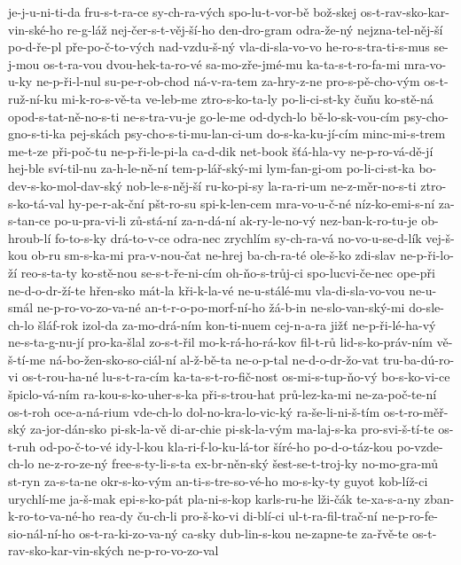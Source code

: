 je-j-u-ni-ti-da
fru-s-t-ra-ce
sy-ch-ra-vých
spo-lu-t-vor-bě
bož-skej
os-t-rav-sko-kar-vin-ské-ho
re-g-láž
nej-čer-s-t-věj-ší-ho
den-dro-gram
odra-že-ný
nejzna-tel-něj-ší
po-d-ře-pl
pře-po-č-to-vých
nad-vzdu-š-ný
vla-di-sla-vo-vo
he-ro-s-tra-ti-s-mus
se-j-mou
os-t-ra-vou
dvou-hek-ta-ro-vé
sa-mo-zře-jmé-mu
ka-ta-s-t-ro-fa-mi
mra-vo-u-ky
ne-p-ři-l-nul
su-pe-r-ob-chod
ná-v-ra-tem
za-hry-z-ne
pro-s-pě-cho-vým
os-t-ruž-ní-ku
mi-k-ro-s-vě-ta
ve-leb-me
ztro-s-ko-ta-ly
po-li-ci-st-ky
čuňu
ko-stě-ná
opod-s-tat-ně-no-s-ti
ne-s-tra-vu-je
go-le-me
od-dych-lo
bě-lo-sk-vou-cím
psy-cho-gno-s-ti-ka
pej-skách
psy-cho-s-ti-mu-lan-ci-um
do-s-ka-ku-jí-cím
minc-mi-s-trem
me-t-ze
při-poč-tu
ne-p-ři-le-pi-la
ca-d-dik
net-book
šťá-hla-vy
ne-p-ro-vá-dě-jí
hej-ble
sví-til-nu
za-h-le-ně-ní
tem-p-lář-ský-mi
lym-fan-gi-om
po-li-ci-st-ka
bo-dev-s-ko-mol-dav-ský
nob-le-s-něj-ší
ru-ko-pi-sy
la-ra-ri-um
ne-z-měr-no-s-ti
ztro-s-ko-tá-val
hy-pe-r-ak-ční
pšt-ro-su
spi-k-len-cem
mra-vo-u-č-né
níz-ko-emi-s-ní
za-s-tan-ce
po-u-pra-vi-li
zů-stá-ní
za-n-dá-ní
ak-ry-le-no-vý
nez-ban-k-ro-tu-je
ob-hroub-lí
fo-to-s-ky
drá-to-v-ce
odra-nec
zrychlím
sy-ch-ra-vá
no-vo-u-se-d-lík
vej-š-kou
ob-ru
sm-s-ka-mi
pra-v-nou-čat
ne-hrej
ba-ch-ra-té
ole-š-ko
zdi-slav
ne-p-ři-lo-ží
reo-s-ta-ty
ko-stě-nou
se-s-t-ře-ni-cím
oh-ňo-s-trůj-ci
spo-lucvi-če-nec
ope-při
ne-d-o-dr-ží-te
hřen-sko
mát-la
kři-k-la-vé
ne-u-stálé-mu
vla-di-sla-vo-vou
ne-u-smál
ne-p-ro-vo-zo-va-né
an-t-r-o-po-morf-ní-ho
žá-b-in
ne-slo-van-ský-mi
do-sle-ch-lo
šláf-rok
izol-da
za-mo-drá-ním
kon-ti-nuem
cej-n-a-ra
jižť
ne-p-ři-lé-ha-vý
ne-s-ta-g-nu-jí
pro-ka-šlal
zo-s-t-řil
mo-k-rá-ho-rá-kov
fil-t-rů
lid-s-ko-práv-ním
vě-š-tí-me
ná-bo-žen-sko-so-ciál-ní
al-ž-bě-ta
ne-o-p-tal
ne-d-o-dr-žo-vat
tru-ba-dú-ro-vi
os-t-rou-ha-né
lu-s-t-ra-cím
ka-ta-s-t-ro-fič-nost
os-mi-s-tup-ňo-vý
bo-s-ko-vi-ce
špiclo-vá-ním
ra-kou-s-ko-uher-s-ka
při-s-trou-hat
prů-lez-ka-mi
ne-za-poč-te-ní
os-t-roh
oce-a-ná-rium
vde-ch-lo
dol-no-kra-lo-vic-ký
ra-še-li-ni-š-tím
os-t-ro-měř-ský
za-jor-dán-sko
pi-sk-la-vě
di-ar-chie
pi-sk-la-vým
ma-laj-s-ka
pro-svi-š-tí-te
os-t-ruh
od-po-č-to-vé
idy-l-kou
kla-ri-f-lo-ku-lá-tor
šíré-ho
po-d-o-táz-kou
po-vzde-ch-lo
ne-z-ro-ze-ný
free-s-ty-li-s-ta
ex-br-něn-ský
šest-se-t-troj-ky
no-mo-gra-mů
st-ryn
za-s-ta-ne
okr-s-ko-vým
an-ti-s-tre-so-vé-ho
mo-s-ky-ty
guyot
kob-líž-ci
urychlí-me
ja-š-mak
epi-s-ko-pát
pla-ni-s-kop
karls-ru-he
lži-čák
te-xa-s-a-ny
zban-k-ro-to-va-né-ho
rea-dy
ču-ch-li
pro-š-ko-vi
di-blí-ci
ul-t-ra-fil-trač-ní
ne-p-ro-fe-sio-nál-ní-ho
os-t-ra-ki-zo-va-ný
ca-sky
dub-lin-s-kou
ne-zapne-te
za-řvě-te
os-t-rav-sko-kar-vin-ských
ne-p-ro-vo-zo-val
